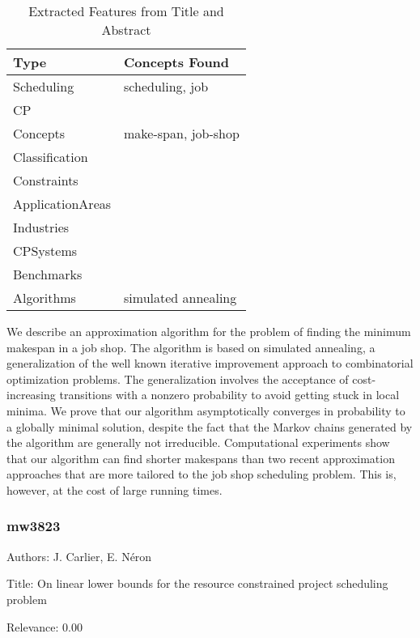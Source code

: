 {\scriptsize
\begin{longtable}{p{2cm}p{20cm}}
\caption{Extracted Features from Title and Abstract}\\ \toprule
Type & Concepts Found\\ \midrule
\endhead
\bottomrule
\endfoot
Scheduling & scheduling, job\\ 
CP & \\ 
Concepts & make-span, job-shop\\ 
Classification & \\ 
Constraints & \\ 
ApplicationAreas & \\ 
Industries & \\ 
CPSystems & \\ 
Benchmarks & \\ 
Algorithms & simulated annealing\\ 
\end{longtable}
}

  We describe an approximation algorithm for the problem of finding the minimum makespan in a job shop. The algorithm is based on simulated annealing, a generalization of the well known iterative improvement approach to combinatorial optimization problems. The generalization involves the acceptance of cost-increasing transitions with a nonzero probability to avoid getting stuck in local minima. We prove that our algorithm asymptotically converges in probability to a globally minimal solution, despite the fact that the Markov chains generated by the algorithm are generally not irreducible. Computational experiments show that our algorithm can find shorter makespans than two recent approximation approaches that are more tailored to the job shop scheduling problem. This is, however, at the cost of large running times.  

\subsubsection{mw3823}
\label{mw:mw3823}

Authors: J. Carlier, E. Néron

Title: On linear lower bounds for the resource constrained project scheduling problem

Relevance:  0.00

